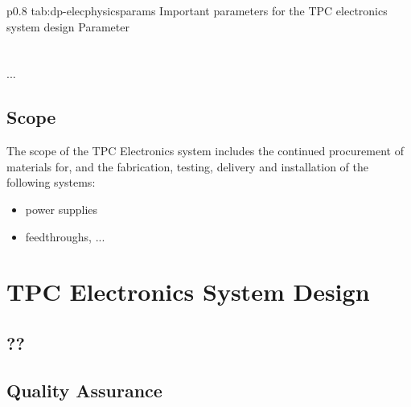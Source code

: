 \begin{dunetable}
{p{0.8\textwidth}}
{tab:dp-elecphysicsparams}
{Important parameters for the  TPC electronics system design}   
Parameter  \\ \toprowrule
  \\ \colhline
   \\ \colhline
 ...\\ 
\end{dunetable}



\subsection{Scope}
\label{sec:fddp-tpc-elec-scope}

The scope of the TPC Electronics system includes the continued procurement of materials for, and the fabrication, testing, delivery and installation of the following systems: 


\begin{itemize}
\item power supplies 
\item feedthroughs, ...
\end{itemize}



\section{TPC Electronics System Design}
\label{sec:fddp-tpc-elec-design}




\subsection{??}
\label{sec:fddp-tpc-elec-??}

\subsection{Quality Assurance}
\label{sec:fddp-tpc-elec-qa}




